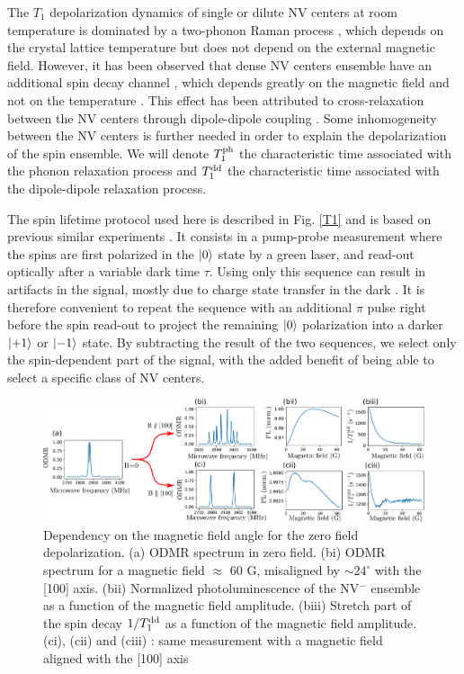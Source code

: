 \documentclass[preprintnumbers,amsmath,amssymb,superscriptaddress,twocolumn,showpacs]{revtex4-2}
\begin{document}
The $T_1$ depolarization dynamics of single or dilute NV centers at room temperature is dominated by a two-phonon Raman process \citep{redman1991spin,jarmola_temperature-_2012,norambuena2018spin}, which depends on the crystal lattice temperature but does not depend on the external magnetic field. However, it has been observed that dense NV centers ensemble have an additional spin decay channel \citep{jarmola_temperature-_2012,jarmola_longitudinal_2015,mrozek_longitudinal_2015, choi_depolarization_2017, akhmedzhanov_microwave-free_2017, akhmedzhanov_magnetometry_2019, pellet2021magnetic, mrozek2021characterization}, which depends greatly on the magnetic field and not on the temperature . This effect has been attributed to cross-relaxation between the NV centers through dipole-dipole coupling \citep{mrozek_longitudinal_2015, choi_depolarization_2017}. Some inhomogeneity between the NV centers is further needed in order to explain the depolarization of the spin ensemble. We will denote $T_1^{\rm ph}$ the characteristic time associated with the phonon relaxation process and $T_1^{\rm dd}$ the characteristic time associated with the dipole-dipole relaxation process.

The spin lifetime protocol used here is described in Fig. \ref{T1} and is based on previous similar experiments \citep{jarmola_temperature-_2012, mrozek_longitudinal_2015, choi_depolarization_2017}. It consists in a pump-probe measurement where the spins are first polarized in the $\ket{0}$ state by a green laser, and read-out optically after a variable dark time $\tau$. Using only this sequence can result in artifacts in the signal, mostly due to charge state transfer in the dark \citep{giri_coupled_2018, giri_selective_2019}. It is therefore convenient to repeat the sequence with an additional $\pi$ pulse right before the spin read-out to project the remaining $\ket{0}$ polarization into a darker $\ket{+1}$ or $\ket{-1}$ state. By subtracting the result of the two sequences, we select only the spin-dependent part of the signal, with the added benefit of being able to select a specific class of NV centers. 

\begin{figure}
\includegraphics[width=.95\textwidth]{Figures/fig 100 vs 1x1x1x1}
\caption{Dependency on the magnetic field angle for the zero field depolarization. (a) ODMR spectrum in zero field. (bi) ODMR spectrum for a magnetic field $\approx$ 60 G, misaligned by $\sim  24^\circ$ with the [100] axis. (bii) Normalized photoluminescence of the NV$^-$ ensemble as a function of the magnetic field amplitude. (biii) Stretch part of the spin decay $1/T_1^{\rm dd}$ as a function of the magnetic field amplitude. (ci), (cii) and (ciii) : same measurement with a magnetic field aligned with the [100] axis}
\label{100_VS_1x4}
\end{figure}
\end{document}
